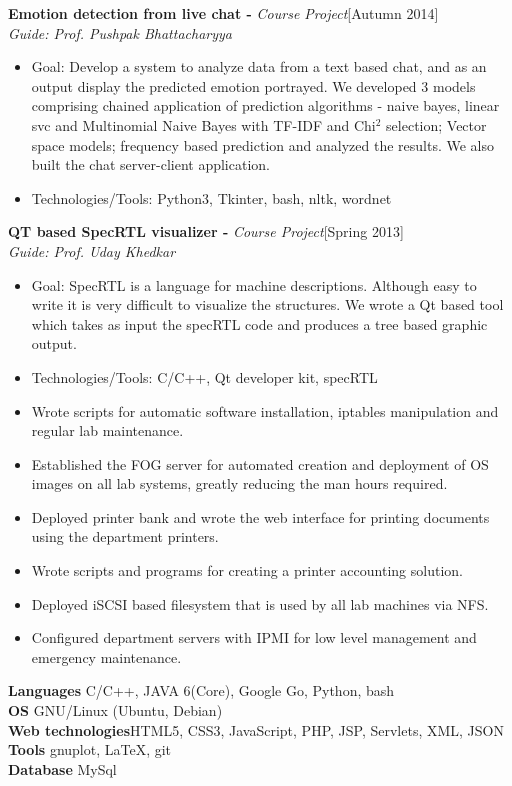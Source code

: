\documentclass[a4paper,10pt]{article}
\newcommand{\header}[1]{
\begin{center}
\fbox{\begin{minipage}{\textwidth}
\raggedright \large \bf #1
\end{minipage}}
\end{center}
\vspace{-0.3cm}
}
\begin{document}
\noindent
\textbf{Emotion detection from live chat -} \emph{Course Project}\hfill[Autumn 2014] \\
\emph{Guide: Prof. Pushpak Bhattacharyya}
\begin{itemize}
 \item Goal: Develop a system to analyze data from a text based chat, and as an output display the predicted emotion portrayed. We developed 3 models comprising chained application of prediction algorithms - naive bayes, linear svc and Multinomial Naive Bayes with TF-IDF and Chi$^2$ selection; Vector space models; frequency based prediction and analyzed the results. We also built the chat server-client application.
 \item Technologies/Tools: Python3, Tkinter, bash, nltk, wordnet
\end{itemize}

\noindent
\textbf{QT based SpecRTL  visualizer -} \emph{Course Project}\hfill[Spring 2013] \\
\emph{Guide: Prof. Uday Khedkar}
\begin{itemize}
 \item Goal: SpecRTL is a language for machine descriptions. Although easy to write it is very difficult to visualize the structures. We wrote a Qt based tool which takes as input the specRTL code and produces a tree based graphic output.
 \item Technologies/Tools: C/C++, Qt developer kit, specRTL
\end{itemize}
\endgroup

\vspace{-0.8cm}
\header{RA Work - System Administrator}
\vspace{-0.2cm}
\begin{itemize}
 \item Wrote scripts for automatic software installation, iptables manipulation and regular lab maintenance.
 \item Established the FOG server for automated creation and deployment of OS images on all lab systems, greatly reducing the man hours required.
 \item Deployed printer bank and wrote the web interface for printing documents using the department printers.
 \item Wrote scripts and programs for creating a printer accounting solution.
 \item Deployed iSCSI based filesystem that is used by all lab machines via NFS.
 \item Configured department servers with IPMI for low level management and emergency maintenance.
\end{itemize}

\vspace{-0.8cm}
\header{Skills}
\vspace{0.1cm}
\textbf{Languages} \hfill C/C++, JAVA 6(Core), Google Go, Python, bash \\
\textbf{OS} \hfill GNU/Linux (Ubuntu, Debian) \\
\textbf{Web technologies}\hfill HTML5, CSS3, JavaScript, PHP, JSP, Servlets, XML, JSON \\
\textbf{Tools} \hfill gnuplot, \LaTeX, git \\
\textbf{Database} \hfill MySql \\
\end{document}
